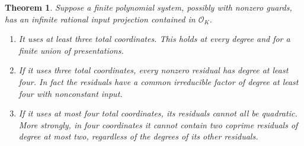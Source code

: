 \documentclass[11pt]{article}
\newtheorem{theorem}{Theorem}[section]
\theoremstyle{definition}
\begin{document}
\begin{theorem}\label{p3sys:small-coordinate-bounds}
Suppose a finite polynomial system, possibly with nonzero guards,
has an infinite rational input projection contained in
$\mathcal O_K$.
\begin{enumerate}
\item It uses at least three total coordinates.  This holds at every
degree and for a finite union of presentations.
\item If it uses three total coordinates, every nonzero residual
has degree at least four.  In fact the residuals have a common
irreducible factor of degree at least four with nonconstant input.
\item If it uses at most four total coordinates, its residuals
cannot all be quadratic.  More strongly, in four coordinates it
cannot contain two coprime residuals of degree at most two,
regardless of the degrees of its other residuals.
\end{enumerate}
\end{theorem}
\end{document}
